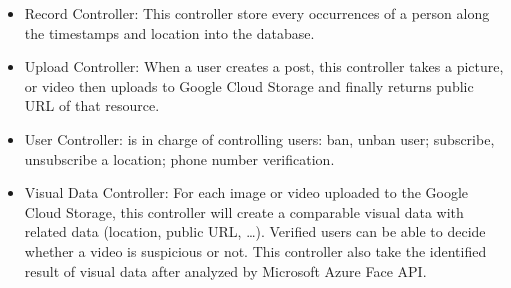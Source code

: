 \begin{itemize}
	\item Record Controller: This controller store every occurrences of a person along the timestamps and location into the database.
	\item Upload Controller: When a user creates a post, this controller takes a picture, or video then uploads to Google Cloud Storage and finally returns public URL of that resource.
	\item User Controller: is in charge of controlling users: ban, unban user; subscribe, unsubscribe a location; phone number verification.
	\item Visual Data Controller: For each image or video uploaded to the Google Cloud Storage, this controller will create a comparable visual data with related data (location, public URL, …). Verified users can be able to decide whether a video is suspicious or not. This controller also take the identified result of visual data after analyzed by Microsoft Azure Face API.    
\end{itemize}

